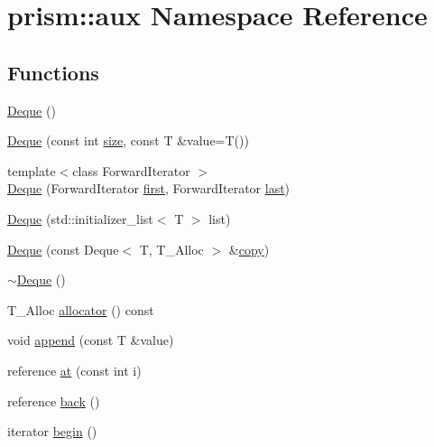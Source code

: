 \hypertarget{namespaceprism_1_1aux}{}\section{prism\+:\+:aux Namespace Reference}
\label{namespaceprism_1_1aux}
\subsection*{Functions}
\begin{DoxyCompactItemize}
\item 
\hyperlink{namespaceprism_1_1aux_a73d05f9bac6f1390e68c9ca400dd90b7}{Deque} ()
\item 
\hyperlink{namespaceprism_1_1aux_a86a5a427044a1cfe6e053583d511f8e0}{Deque} (const int \hyperlink{namespaceprism_1_1aux_a7311aa21cf3af7c4639ea15e4716de1b}{size}, const T \&value=T())
\item 
{\footnotesize template$<$class Forward\+Iterator $>$ }\\\hyperlink{namespaceprism_1_1aux_a4342187804b1509fa1d43846e5049897}{Deque} (Forward\+Iterator \hyperlink{namespaceprism_1_1aux_a16674f8b7bafe0844292be51e17dafa1}{first}, Forward\+Iterator \hyperlink{namespaceprism_1_1aux_a23a89c64fd9ee1f27799fe56c943a44d}{last})
\item 
\hyperlink{namespaceprism_1_1aux_a806cef943a9796d8296803dbc3922a85}{Deque} (std\+::initializer\+\_\+list$<$ T $>$ list)
\item 
\hyperlink{namespaceprism_1_1aux_ae67fb1e567d8a9d942bea9ca8271b45b}{Deque} (const Deque$<$ T, T\+\_\+\+Alloc $>$ \&\hyperlink{namespaceprism_ae776f4cd825f79e7af1cf6ee1d90a209}{copy})
\item 
\hyperlink{namespaceprism_1_1aux_acad2ea6cf2b13bf2f38d16c4cac830e5}{$\sim$\+Deque} ()
\item 
T\+\_\+\+Alloc \hyperlink{namespaceprism_1_1aux_a436e9fe301b9cce4f865df50792524a9}{allocator} () const 
\item 
void \hyperlink{namespaceprism_1_1aux_ae49493cdeebd18bd65b9c54934f13084}{append} (const T \&value)
\item 
reference \hyperlink{namespaceprism_1_1aux_ad5eb3c4af48fe544355159d8e9605c89}{at} (const int i)
\item 
reference \hyperlink{namespaceprism_1_1aux_a7e806dafa121b876ac0eabec88c93c13}{back} ()
\item 
iterator \hyperlink{namespaceprism_1_1aux_aae231a907fc705af50c90313e7f16ad0}{begin} ()
\item 

\end{DoxyCompactItemize}
